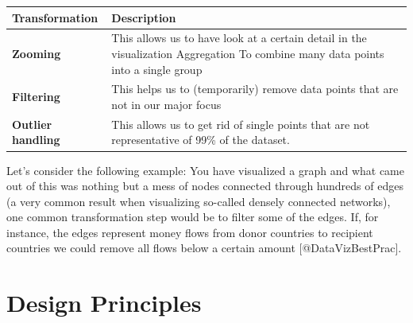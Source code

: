 \documentclass[]{book}
\theoremstyle{definition}
\theoremstyle{definition}
\theoremstyle{definition}
\theoremstyle{remark}
\begin{document}
\begin{longtable}[]{@{}ll@{}}
\toprule
\begin{minipage}[b]{0.16\columnwidth}\raggedright\strut
\textbf{Transformation}\strut
\end{minipage} & \begin{minipage}[b]{0.78\columnwidth}\raggedright\strut
\textbf{Description}\strut
\end{minipage}\tabularnewline
\midrule
\endhead
\begin{minipage}[t]{0.16\columnwidth}\raggedright\strut
\textbf{Zooming}\strut
\end{minipage} & \begin{minipage}[t]{0.78\columnwidth}\raggedright\strut
This allows us to have look at a certain detail in the visualization
Aggregation To combine many data points into a single group\strut
\end{minipage}\tabularnewline
\begin{minipage}[t]{0.16\columnwidth}\raggedright\strut
\textbf{Filtering}\strut
\end{minipage} & \begin{minipage}[t]{0.78\columnwidth}\raggedright\strut
This helps us to (temporarily) remove data points that are not in our
major focus\strut
\end{minipage}\tabularnewline
\begin{minipage}[t]{0.16\columnwidth}\raggedright\strut
\textbf{Outlier handling}\strut
\end{minipage} & \begin{minipage}[t]{0.78\columnwidth}\raggedright\strut
This allows us to get rid of single points that are not representative
of 99\% of the dataset.\strut
\end{minipage}\tabularnewline
\bottomrule
\end{longtable}

Let's consider the following example: You have visualized a graph and
what came out of this was nothing but a mess of nodes connected through
hundreds of edges (a very common result when visualizing so-called
densely connected networks), one common transformation step would be to
filter some of the edges. If, for instance, the edges represent money
flows from donor countries to recipient countries we could remove all
flows below a certain amount {[}@DataVizBestPrac{]}.

\section{Design Principles}\label{design-principles}
\end{document}
